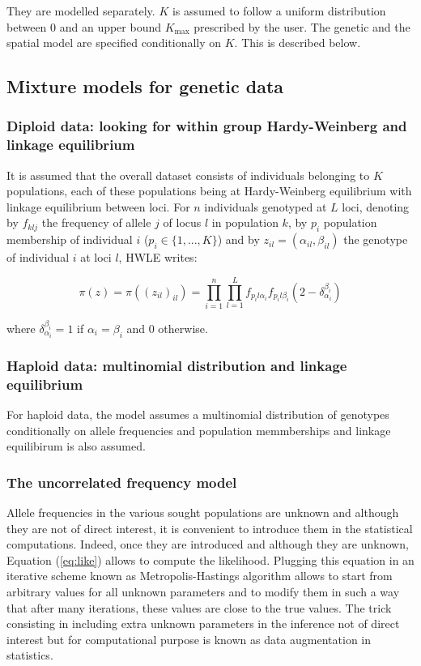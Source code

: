 \documentclass{article}
\begin{document}
They are modelled separately. $K$ is assumed to follow a uniform distribution between 0 and 
an upper bound $K_{\max}$ 
prescribed by the user. The genetic and the spatial model are specified conditionally on $K$. 
This is described below. 



\subsection{Mixture models for genetic data}\label{sec:mixture}
\subsubsection{Diploid data: looking for within group Hardy-Weinberg and linkage equilibrium}

It is assumed that the overall dataset consists of individuals belonging to $K$ populations, 
each of these populations being 
at Hardy-Weinberg equilibrium with linkage equilibrium between loci. For $n$ individuals genotyped at $L$ loci, 
denoting by $f_{klj}$ the frequency of allele 
$j$ of locus $l$ in population $k$, by $p_i$ population membership of individual 
$i$ ($p_i  \in \{1,...,K\}$) and by 
$z_{il}=(\alpha_{il},\beta_{il})$ the genotype of individual $i$ at loci $l$, HWLE writes: 

\begin{equation}\label{eq:like}
\pi(z) = \pi((z_{il})_{il}) = \prod_{i=1}^n  \prod_{l=1}^L f_{p_il\alpha_i}f_{p_il\beta_i}(2-\delta_{\alpha_i}^{\beta_i})
\end{equation}

where $\delta_{\alpha_i}^{\beta_i}=1$ if $\alpha_i = \beta_i$  and  $0$ otherwise.


\subsubsection{Haploid data: multinomial distribution and linkage equilibrium}
For haploid data, the model assumes a multinomial distribution of genotypes conditionally 
on allele frequencies and population memmberships and linkage equilibirum is also assumed.

\subsubsection{The uncorrelated frequency model}

Allele frequencies in the various sought populations are unknown and although they are not of direct interest, 
it is convenient to introduce them in the statistical computations. Indeed, once they are introduced and although 
they are unknown, Equation (\ref{eq:like}) allows to compute the  likelihood. Plugging this equation in an iterative scheme known 
as  Metropolis-Hastings algorithm allows to start from arbitrary values for  
all unknown parameters and to modify them in such 
a way that after many iterations, these values are close to the true values. 
The trick consisting in including extra unknown parameters in the inference not of direct interest but for 
computational purpose is known as data augmentation in statistics. 
\end{document}
